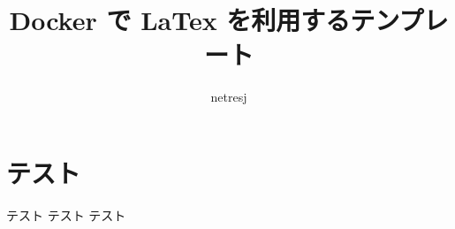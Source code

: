 \documentclass[a4]{jarticle}
\begin{document}
    \title{Docker で LaTex を利用するテンプレート}
    \author{netresj}
    
    \maketitle

    \section{テスト}

    テスト
    テスト
    テスト
\end{document}
